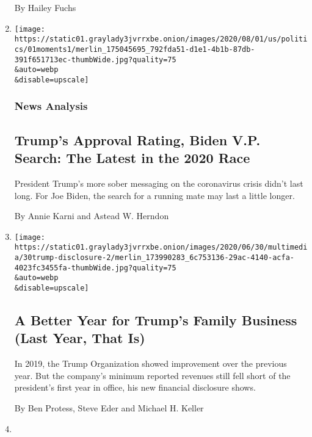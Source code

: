 \begin{enumerate}
  By Hailey Fuchs
\item
  \href{/2020/08/01/us/politics/trump-biden-polls-vp.html}{}

  \texttt{[image: https://static01.graylady3jvrrxbe.onion/images/2020/08/01/us/politics/01moments1/merlin\_175045695\_792fda51-d1e1-4b1b-87db-391f651713ec-thumbWide.jpg?quality=75\\\&auto=webp\\\&disable=upscale]}

  \hypertarget{news-analysis-2}{%
  \subsubsection{News Analysis}\label{news-analysis-2}}

  \hypertarget{trumps-approval-rating-biden-vp-search-the-latest-in-the-2020-race}{%
  \subsection{Trump's Approval Rating, Biden V.P. Search: The Latest in
  the 2020
  Race}\label{trumps-approval-rating-biden-vp-search-the-latest-in-the-2020-race}}

  President Trump's more sober messaging on the coronavirus crisis
  didn't last long. For Joe Biden, the search for a running mate may
  last a little longer.

  By Annie Karni and Astead W. Herndon
\item
  \href{/2020/07/31/business/trump-financial-disclosure.html}{}

  \texttt{[image: https://static01.graylady3jvrrxbe.onion/images/2020/06/30/multimedia/30trump-disclosure-2/merlin\_173990283\_6c753136-29ac-4140-acfa-4023fc3455fa-thumbWide.jpg?quality=75\\\&auto=webp\\\&disable=upscale]}

  \hypertarget{a-better-year-for-trumps-family-business-last-year-that-is}{%
  \subsection{A Better Year for Trump's Family Business (Last Year, That
  Is)}\label{a-better-year-for-trumps-family-business-last-year-that-is}}

  In 2019, the Trump Organization showed improvement over the previous
  year. But the company's minimum reported revenues still fell short of
  the president's first year in office, his new financial disclosure
  shows.

  By Ben Protess, Steve Eder and Michael H. Keller
\item
  \href{/2020/07/31/us/politics/white-house-congress-relief-plan-jobless-aid.html}{}


\end{enumerate}

